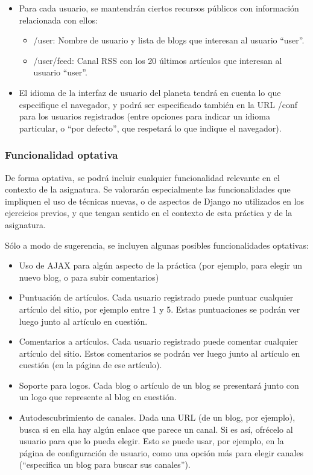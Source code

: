 \begin{itemize}
\item Para cada usuario, se mantendrán ciertos recursos públicos con información relacionada con ellos:

  \begin{itemize}
  \item /user: Nombre de usuario y lista de blogs que interesan al usuario ``user''.
  \item /user/feed: Canal RSS  con los 20 últimos artículos que interesan al usuario ``user''.
  \end{itemize}

\item El idioma de la interfaz de usuario del planeta tendrá en cuenta lo que especifique el navegador, y podrá ser especificado también en la URL /conf para los usuarios registrados (entre opciones para indicar un idioma particular, o ``por defecto'', que respetará lo que indique el navegador).

\end{itemize}

\subsubsection{Funcionalidad optativa}

De forma optativa, se podrá incluir cualquier funcionalidad relevante en el contexto de la asignatura. Se valorarán especialmente las funcionalidades que impliquen el uso de técnicas nuevas, o de aspectos de Django no utilizados en los ejercicios previos, y que tengan sentido en el contexto de esta práctica y de la asignatura.

Sólo a modo de sugerencia, se incluyen algunas posibles funcionalidades optativas:

\begin{itemize}
\item Uso de AJAX para algún aspecto de la práctica (por ejemplo, para elegir un nuevo blog, o para subir comentarios)
\item Puntuación de artículos. Cada usuario registrado puede puntuar cualquier artículo del sitio, por ejemplo entre 1 y 5. Estas puntuaciones se podrán ver luego junto al artículo en cuestión.
\item Comentarios a artículos. Cada usuario registrado puede comentar cualquier artículo del sitio. Estos comentarios se podrán ver luego junto al artículo en cuestión (en la página de ese artículo).
\item Soporte para logos. Cada blog o artículo de un blog se presentará junto con un logo que represente al blog en cuestión.
\item Autodescubrimiento de canales. Dada una URL (de un blog, por ejemplo), busca si en ella hay algún enlace que parece un canal. Si es así, ofrécelo al usuario para que lo pueda elegir. Esto se puede usar, por ejemplo, en la página de configuración de usuario, como una opción más para elegir canales (``especifica un blog para buscar sus canales'').
\end{itemize}

